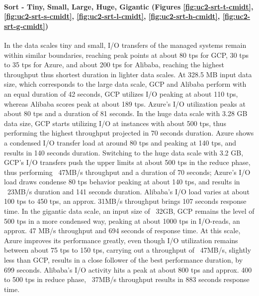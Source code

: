 \documentclass[review]{elsarticle}
\begin{document}
\paragraph{Sort - Tiny, Small, Large, Huge, Gigantic (Figures \ref{fig:uc2-srt-t-cmidt}, \ref{fig:uc2-srt-s-cmidt}, \ref{fig:uc2-srt-l-cmidt}, \ref{fig:uc2-srt-h-cmidt}, \ref{fig:uc2-srt-g-cmidt})} In the data scales tiny and small, I/O transfers of the managed systems remain within similar boundaries, reaching peak points at about 80 tps for GCP, 30 tps to 35 tps for Azure, and about 200 tps for Alibaba, reaching the highest throughput thus shortest duration in lighter data scales. At 328.5 MB input data size, which corresponds to the large data scale, GCP and Alibaba perform with an equal duration of 42 seconds, GCP utilizes I/O peaking at about 110 tps, whereas Alibaba scores peak at about 189 tps. Azure's I/O utilization peaks at about 80 tps and a duration of 81 seconds. In the huge data scale with 3.28 GB data size, GCP starts utilizing I/O at instances with about 500 tps, thus performing the highest throughput projected in 70 seconds duration. Azure shows a condensed I/O transfer load at around 80 tps and peaking at 140 tps, and results in 140 seconds duration. Switching to the huge data scale with 3.2 GB, GCP's I/O transfers push the upper limits at about 500 tps in the reduce phase, thus performing ~47MB/s throughput and a duration of 70 seconds; Azure's I/O load draws condense 80 tps behavior peaking at about 140 tps, and results in ~23MB/s duration and 141 seconds duration. Alibaba's I/O load varies at about 100 tps to 450 tps, an approx. 31MB/s throughput brings 107 seconds response time. In the gigantic data scale, an input size of ~32GB, GCP remains the level of 500 tps in a more condensed way, peaking at about 1000 tps in I/O-reads, an approx. 47 MB/s throughput and 694 seconds of response time. At this scale, Azure improves its performance greatly, even though I/O utilization remains between about 75 tps to 150 tps, carrying out a throughput of ~47MB/s, slightly less than GCP, results in a close follower of the best performance duration, by 699 seconds. Alibaba's I/O activity hits a peak at about 800 tps and approx. 400 to 500 tps in reduce phase, ~37MB/s throughput results in 883 seconds response time.
\end{document}
